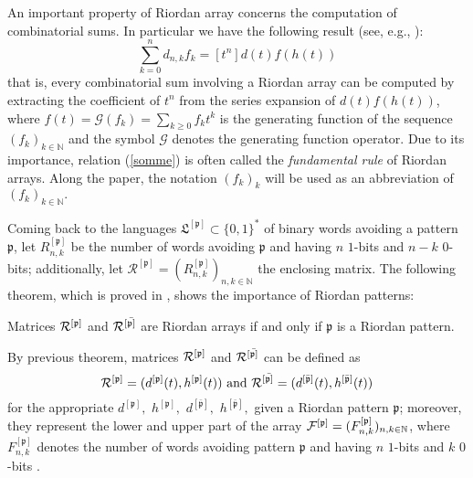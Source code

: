 An important property of Riordan array concerns the computation of
combinatorial sums.  In particular we have the following result (see, e.g.,
\citep{LUZON2012631,Merlini:2009:CSI:2653507.2654195,SPRUGNOLI1994267}):
\begin{equation}
    \label{somme}
    \sum_{k=0}^n d_{n,k}f_k=[t^n]d(t)f(h(t))
\end{equation}
that is, every combinatorial sum involving a Riordan array can be computed by
extracting the coefficient of $t^n$ from the series expansion of $d(t)f(h(t))$,
where $f(t)=\mathcal{G}(f_k)=\sum_{k\geq 0}f_kt^k$ is the generating function of the
sequence $(f_k)_{k \in\mathbb{N}}$ and the symbol $\mathcal{G}$ denotes the generating function
operator. Due to its importance, relation (\ref{somme}) is often called the
\textit{fundamental rule} of Riordan arrays.  Along the paper, the notation
$(f_k)_{k}$ will be used as an abbreviation of $(f_k)_{k\in\mathbb{N}}.$

Coming back to the languages $\mathfrak{L}^{[\mathfrak{p}]}\subset \{0,1\}^*$
of binary words avoiding a pattern $\mathfrak{p}$, let
$R_{n,k}^{[\mathfrak{p}]}$ be the number of words avoiding $\mathfrak{p}$ and
having $n$ $1$-bits  and $n-k$  $0$-bits; additionally, let
$\mathcal{R}^{[\mathfrak{p}]}=\left(R_{n,k}^{[\mathfrak{p}]}\right)_{n,k\in\mathbb{N}}$
the enclosing matrix. The following theorem, which is proved in \citep{MERLINI20112988},
shows the importance of Riordan patterns:
\begin{teo}
\label{main}
Matrices ${\cal{R}^{[\mathfrak{p}]}}$ and ${\cal{R}^{[\bar{\mathfrak{p}]}}}$
are Riordan arrays if and only if  $\mathfrak{p}$ is a Riordan pattern.
\end{teo}

By previous theorem, matrices ${\cal{R}^{[\mathfrak{p}]}}$ and
${\cal{R}^{[\bar{\mathfrak{p}]}}}$ can be defined as
$${\cal{R}^{[\mathfrak{p}]}}=(d^{[\mathfrak{p}]}(t),h^{[\mathfrak{p}]}(t)) \text{ and }
{\cal{R}^{[\bar{\mathfrak{p}]}}}=(d^{[\bar{\mathfrak{p}}]}(t),h^{[\bar{\mathfrak{p}}]}(t))$$
for the appropriate $d^{[\mathfrak{p}]},$ $h^{[\mathfrak{p}]},$ $d^{[\bar{\mathfrak{p}}]},$
$h^{[\bar{\mathfrak{p}}]},$ given a Riordan pattern $\mathfrak{p}$; moreover, they represent the lower and
upper part of the array
${\cal{F}^{[\mathfrak{p}]}}=(F_{n,k}^{[\mathfrak{p}]})_{n,k \in \mathbb{N}}$,
where $F_{n,k}^{[\mathfrak{p}]}$ denotes the number of words avoiding pattern
$\mathfrak{p}$ and having $n$ $1$-bits  and $k$ $0$-bits . 

